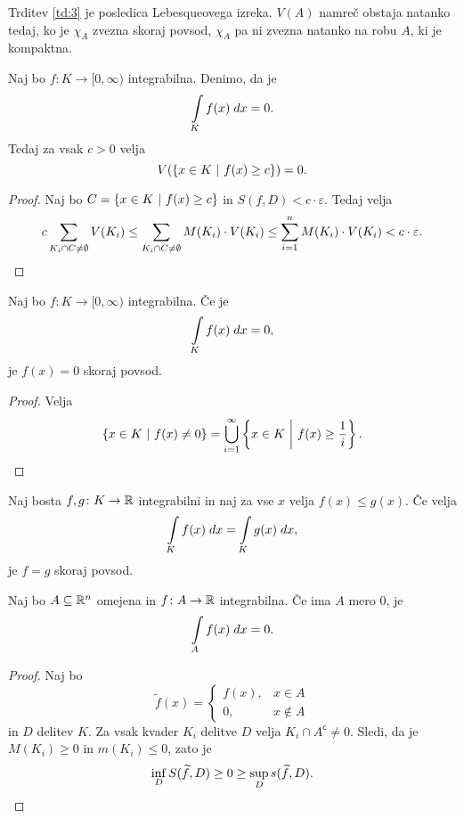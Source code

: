 \begin{opomba}
Trditev \ref{td:3} je posledica Lebesqueovega izreka. $V(A)$ namreč
obstaja natanko tedaj, ko je $\chi_A $ zvezna skoraj povsod,
$\chi_A$ pa ni zvezna natanko na robu $A$, ki je kompaktna.
\end{opomba}

\begin{lema}
Naj bo $f \colon K \to [0,\infty)$ integrabilna. Denimo, da je
\[
\int\limits_K f(x)\;dx = 0.
\]
Tedaj za vsak $c > 0$ velja
\[
V(\left\{x \in K~\middle\vert~f(x) \geq c\right\}) = 0.
\]
\end{lema}

\begin{proof}
Naj bo $C = \left\{x \in K~\middle\vert~f(x) \geq c\right\}$ in
$S(f,D) < c \cdot \varepsilon$. Tedaj velja
\[
c \sum_{K_i \cap C \ne \emptyset} V(K_i) \leq
\sum_{K_i \cap C \ne \emptyset} M(K_i) \cdot V(K_i) \leq
\sum_{i=1}^n M(K_i) \cdot V(K_i) <
c \cdot \varepsilon. \qedhere
\]
\end{proof}

\begin{posledica}
Naj bo $f \colon K \to [0,\infty)$ integrabilna. Če je
\[
\int\limits_K f(x)\;dx = 0,
\]
je $f(x) = 0$ skoraj povsod.
\end{posledica}

\begin{proof}
Velja
\[
\left\{x \in K~\middle\vert~f(x) \ne 0\right\} =
\bigcup_{i=1}^\infty \left\{x \in K~\middle\vert~f(x) \geq \frac{1}{i}\right\}.
\qedhere
\]
\end{proof}

\begin{posledica}
Naj bosta $f,g \colon K \to \mathbb{R}$ integrabilni in naj za vse $x$
velja $f(x) \leq g(x)$. Če velja
\[
\int\limits_K f(x)\;dx = \int\limits_K g(x)\;dx,
\]
je $f=g$ skoraj povsod.
\end{posledica}

\begin{trditev}
Naj bo $A \subseteq \mathbb{R}^n$ omejena in $f \colon A \to \mathbb{R}$
integrabilna. Če ima $A$ mero $0$, je
\[
\int\limits_A f(x)\;dx = 0.
\]
\end{trditev}

\begin{proof}
Naj bo
\[
\widetilde{f}(x) = \begin{cases}
f(x), &x \in A
\\
0, &x \not \in A
\end{cases}
\]
in $D$ delitev $K$. Za vsak kvader $K_i$ delitve $D$ velja
$K_i \cap A^\mathsf{c} \ne 0$. Sledi, da je $M(K_i) \geq 0$ in
$m(K_i) \leq 0$, zato je
\[
\inf_D S(\widetilde{f},D) \geq 0 \geq \sup_D s(\widetilde{f},D).
\qedhere
\]
\end{proof}

